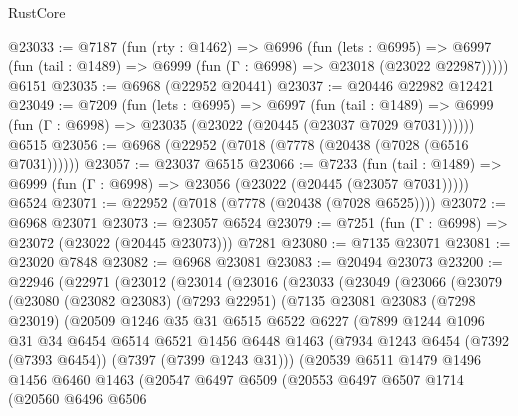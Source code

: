 \begin{lexlean}{RustCore}
\begin{coremodule}
@23033 := @7187
    (fun (rty : @1462) =>
    @6996
      (fun (lets : @6995) =>
      @6997 (fun (tail : @1489) => @6999 (fun (Γ : @6998) => @23018 (@23022 @22987)))))
    @6151
@23035 := @6968 (@22952 @20441)
@23037 := @20446 @22982 @12421
@23049 := @7209
    (fun (lets : @6995) =>
    @6997
      (fun (tail : @1489) =>
      @6999 (fun (Γ : @6998) => @23035 (@23022 (@20445 (@23037 @7029 @7031))))))
    @6515
@23056 := @6968 (@22952 (@7018 (@7778 (@20438 (@7028 (@6516 @7031))))))
@23057 := @23037 @6515
@23066 := @7233
    (fun (tail : @1489) => @6999 (fun (Γ : @6998) => @23056 (@23022 (@20445 (@23057 @7031)))))
    @6524
@23071 := @22952 (@7018 (@7778 (@20438 (@7028 @6525))))
@23072 := @6968 @23071
@23073 := @23057 @6524
@23079 := @7251 (fun (Γ : @6998) => @23072 (@23022 (@20445 @23073))) @7281
@23080 := @7135 @23071
@23081 := @23020 @7848
@23082 := @6968 @23081
@23083 := @20494 @23073
@23200 := @22946
    (@22971
      (@23012
        (@23014
          (@23016
            (@23033
              (@23049
                (@23066
                  (@23079
                    (@23080
                      (@23082 @23083)
                      (@7293 @22951)
                      (@7135
                        @23081
                        @23083
                        (@7298 @23019)
                        (@20509
                          @1246
                          @35
                          @31
                          @6515
                          @6522
                          @6227
                          (@7899
                            @1244
                            @1096
                            @31
                            @34
                            @6454
                            @6514
                            @6521
                            @1456
                            @6448
                            @1463
                            (@7934 @1243 @6454 (@7392 (@7393 @6454)) (@7397 (@7399 @1243 @31)))
                            (@20539
                              @6511
                              @1479
                              @1496
                              @1456
                              @6460
                              @1463
                              (@20547
                                @6497
                                @6509
                                (@20553
                                  @6497
                                  @6507
                                  @1714
                                  (@20560
                                    @6496
                                    @6506

\end{coremodule}
\end{lexlean}
